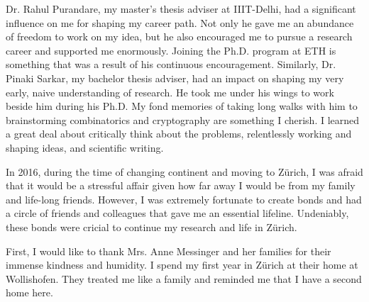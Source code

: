 Dr. Rahul Purandare, my master's thesis adviser at IIIT-Delhi, had a significant influence on me for shaping my career path. Not only he gave me an abundance of freedom to work on my idea, but he also encouraged me to pursue a research career and supported me enormously. Joining the Ph.D. program at ETH is something that was a result of his continuous encouragement. Similarly, Dr. Pinaki Sarkar, my bachelor thesis adviser, had an impact on shaping my very early, naive understanding of research. He took me under his wings to work beside him during his Ph.D. My fond memories of taking long walks with him to brainstorming combinatorics and cryptography are something I cherish. I learned a great deal about critically think about the problems, relentlessly working and shaping ideas, and scientific writing.


In 2016, during the time of changing continent and moving to Z\"urich, I was afraid that it would be a stressful affair given how far away I would be from my family and life-long friends. However, I was extremely fortunate to create bonds and had a circle of friends and colleagues that gave me an essential lifeline. Undeniably, these bonds were cricial to continue my research and life in Z\"urich. 


First, I would like to thank Mrs. Anne Messinger and her families for their immense kindness and humidity. I spend my first year in Z\"urich at their home at Wollishofen. They treated me like a family and reminded me that I have a second home here. 


